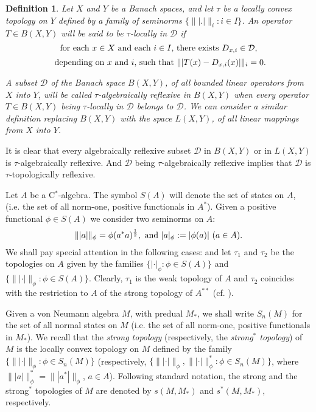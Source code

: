 \documentclass[11pt]{amsart}
\newtheorem{definition}[theorem]{Definition}
\begin{document}
\begin{definition}\label{def tau-local derivations} Let $X$ and $Y$ be a Banach spaces, and let $\tau$ be a locally convex topology on $Y$ defined by a family of seminorms $\big\{ \||.|\|_i : i\in I\Big\}$. An operator $T\in B(X,Y)$ will be said to be $\tau$-locally in $\mathcal{D}$ if \begin{equation}\label{eq tau-locally in D} \hbox{for each $x\in X$ and each $i\in I$, there exists $D_{x,i}\in \mathcal{D}$,}
\end{equation} $$\hbox{ depending on $x$ and $i$, such that $\||T(x) -D_{x,i} (x)|\|_i =0.$}$$\vspace{0.1mm}

A subset $\mathcal{D}$ of the Banach space $B(X,Y)$, of all bounded linear operators from $X$ into $Y$, will be called \emph{$\tau$-algebraically reflexive} in $B(X,Y)$ when every operator $T\in B(X,Y)$ being $\tau$-locally in $\mathcal{D}$ belongs to $\mathcal{D}$. We can consider a similar definition replacing $B(X,Y)$ with the space $L(X,Y)$, of all linear mappings from $X$ into $Y$.
\end{definition}

It is clear that every algebraically reflexive subset $\mathcal{D}$ in $B(X,Y)$ or in $L(X,Y)$ is $\tau$-algebraically reflexive. And $\mathcal{D}$ being  $\tau$-algebraically reflexive implies that $\mathcal{D}$ is $\tau$-topologically reflexive.\smallskip

Let $A$ be a C$^*$-algebra. The symbol $S(A)$ will denote the set of states on $A$, (i.e. the set of all norm-one, positive functionals in $A^*$). Given a positive functional $\phi\in S(A)$ we consider two seminorms on $A$: $$\||a|\|_{\phi} = \phi (a^* a)^{\frac12},\hbox{ and } |a|_{\phi}:=|\phi (a)| \ (a\in A).$$ We shall pay special attention in the following cases: and let $\tau_1$ and $\tau_2$ be the topologies on $A$ given by the families $\{  |\cdot|_{\phi} : \phi\in S(A)\}$ and $\{\||\cdot|\|_{\phi} : \phi\in S(A) \}$. Clearly, $\tau_1$ is the weak topology of $A$ and $\tau_2$ coincides with the restriction to $A$ of the strong topology of $A^{**}$ (cf. \cite[Definition 1.8.6]{Sak}).\smallskip

Given a von Neumann algebra $M$, with predual $M_*$, we shall write $S_{n} (M)$ for the set of all normal states on $M$ (i.e. the set of all norm-one, positive functionals in $M_*$). We recall \cite[Definitions 1.8.6 and 1.8.7]{Sak} that the \emph{strong topology} (respectively, the \emph{strong$^*$ topology}) of $M$ is the locally convex topology on $M$ defined by the family $\{\||\cdot|\|_{\phi} : \phi\in S_n(M) \}$ (respectively, $\{\||\cdot|\|_{\phi}, \||\cdot|\|^*_{\phi} : \phi\in S_n(M) \}$, where $\||a|\|^*_{\phi}  = \||a^*|\|_{\phi}$, $a\in A$). Following standard notation, the strong and the strong$^*$ topologies of $M$ are denoted by $s(M, M_*)$ and $s^*(M, M_*)$, respectively.\smallskip
\end{document}
